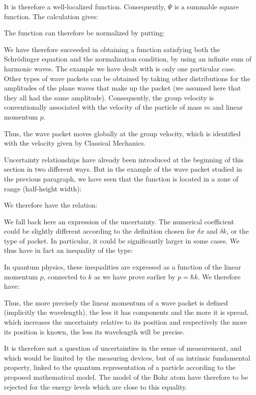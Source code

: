 	It is therefore a well-localized function. Consequently, $\Psi$ is a summable square function. The calculation gives:
	
	The function can therefore be normalized by putting:
	
	We have therefore succeeded in obtaining a function satisfying both the Schrödinger equation and the normalization condition, by using an infinite sum of harmonic waves. The example we have dealt with is only one particular case. Other types of wave packets can be obtained by taking other distributions for the amplitudes of the plane waves that make up the packet (we assumed here that they all had the same amplitude). Consequently, the group velocity is conventionally associated with the velocity of the particle of mass $m$ and linear momentum $p$.

	Thus, the wave packet moves globally at the group velocity, which is identified with the velocity given by Classical Mechanics.

	Uncertainty relationships have already been introduced at the beginning of this section in two different ways. But in the example of the wave packet studied in the previous paragraph, we have seen that the function is located in a zone of range (half-height width):
	
	We therefore have the relation:
	
	We fall back here an expression of the uncertainty. The numerical coefficient could be slightly different according to the definition chosen for $\delta x$ and $\delta k$, or the type of packet. In particular, it could be significantly larger in some cases. We thus have in fact an inequality of the type:
	
	In quantum physics, these inequalities are expressed as a function of the linear momentum $p$, connected to $k$ as we have prove earlier by $p=\hbar k$. We therefore have:
	
	Thus, the more precisely the linear momentum of a wave packet is defined (implicitly the wavelength), the less it has components and the more it is spread, which increases the uncertainty relative to its position and respectively the more its position is known, the less its wavelength will be precise.

	It is therefore not a question of uncertainties in the sense of measurement, and which would be limited by the measuring devices, but of an intrinsic fundamental property, linked to the quantum representation of a particle according to the proposed mathematical model. The model of the Bohr atom have therefore to be rejected for the energy levels which are close to this equality.
	
